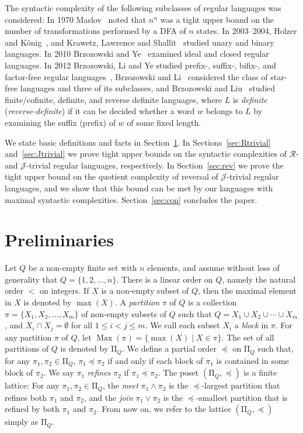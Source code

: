 \documentclass{llncs}
\renewcommand{\le}{\leqslant}
\newcommand{\gR}{{\mathcal R}}
\newcommand{\gJ}{{\mathcal J}}
\newcommand{\rmPi}{{\mathrm \Pi}}
\newcommand{\meet}{{\mathbin{\wedge}}}
\newcommand{\join}{{\mathbin{\vee}}}
\DeclareMathOperator{\Max}{Max}
\begin{document}
The syntactic complexity of the following subclasses of regular languages was considered: In 1970 Maslov~\cite{Mas70} noted that $n^n$ was a tight upper bound on the number of transformations performed by a DFA of $n$ states. In 2003--2004, Holzer and K\"onig~\cite{HoKo04}, and Krawetz, Lawrence and Shallit~\cite{KLS03} studied unary and binary languages. In 2010 Brzozowski and Ye~\cite{BrYe11} examined ideal and closed regular languages. In 2012 Brzozowski, Li and Ye studied prefix-, suffix-, bifix-, and factor-free regular languages~\cite{BLY12}, Brzozowski and Li~\cite{BL12a} considered the class of star-free languages and three of its subclasses, and Brzozowski and Liu~\cite{BrLiu12} studied finite/cofinite, definite, and reverse definite languages, where 
$L$ is \emph{definite} (\emph{reverse-definite}) if it can be decided whether a word $w$ belongs to $L$ by examining the suffix (prefix) of $w$ of some fixed length.

We state basic definitions and facts in Section~\ref{sec:pre}. In Sections~\ref{sec:Rtrivial} and~\ref{sec:Jtrivial} we prove tight upper bounds on the syntactic complexities of $\gR$- and $\gJ$-trivial regular languages, respectively. 
In Section~\ref{sec:rev} we prove the tight upper bound on the quotient complexity of reversal of $\gJ$-trivial regular languages, and we show that this bound can be met by our languages with maximal syntactic complexities. 
Section~\ref{sec:con} concludes the paper. 


\section{Preliminaries}\label{sec:pre}

Let $Q$ be a non-empty finite set with $n$ elements, and assume without loss of generality that $Q = \{1,2,\ldots, n\}$. There is a linear order on $Q$, namely the natural order $<$ on integers. If $X$ is a non-empty subset of $Q$, then the maximal element in $X$ is denoted by $\max(X)$. A \emph{partition} $\pi$ of $Q$ is a collection $\pi = \{X_1, X_2, \ldots, X_m\}$ of non-empty subsets of $Q$ such that  $Q = X_1 \cup X_2 \cup \cdots \cup X_m$, and
$X_i \cap X_j = \emptyset$ for all $1 \le i < j \le m$.
We call each subset $X_i$ a \emph{block} in $\pi$. For any partition $\pi$ of $Q$, let $\Max(\pi) = \{\max(X) \mid X \in \pi\}$. The set of all partitions of $Q$ is denoted by $\rmPi_Q$. We define a partial order $\preceq$ on $\rmPi_Q$ such that, for any $\pi_1, \pi_2 \in \rmPi_Q$, $\pi_1 \preceq \pi_2$ if and only if each block of $\pi_1$ is contained in some block of $\pi_2$. We say $\pi_1$ \emph{refines} $\pi_2$ if $\pi_1 \preceq \pi_2$. 
The poset $(\rmPi_Q, \preceq)$ is a finite lattice: For any $\pi_1, \pi_2 \in \rmPi_Q$, the \emph{meet} $\pi_1 \meet \pi_2$ is the $\preceq$-largest partition that refines both $\pi_1$ and $\pi_2$, and the \emph{join} $\pi_1 \join \pi_2$ is the $\preceq$-smallest partition that is refined by both $\pi_1$ and $\pi_2$. From now on, we refer to the lattice $(\rmPi_Q, \preceq)$ simply  as $\rmPi_Q$. 
\end{document}
